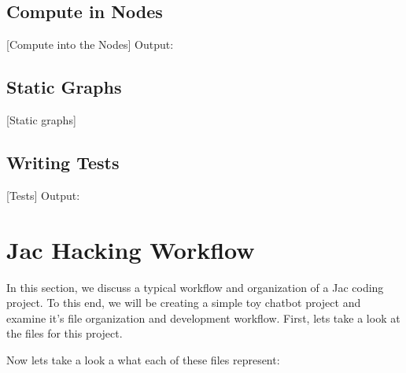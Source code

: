 \subsection{Compute in Nodes}
[Compute into the Nodes]
Output:

\subsection{Static Graphs}
[Static graphs]

\subsection{Writing Tests}
[Tests]
Output:

\section{Jac Hacking Workflow}
In this section, we discuss a typical workflow and organization of a Jac coding project. To this end, we will be creating a simple toy chatbot project and examine it's file organization and development workflow. First, lets take a look at the files for this project.
\par
{}

Now lets take a look a what each of these files represent:

